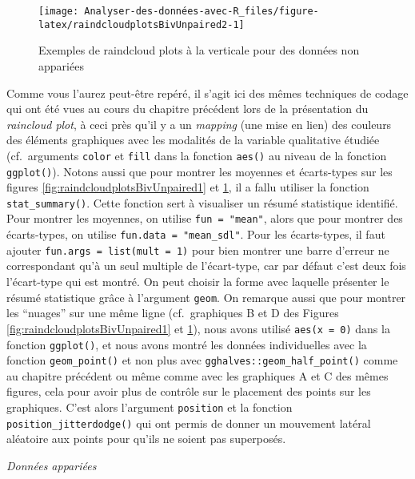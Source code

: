 \documentclass[
  french,
]{book}
\begin{document}
\begin{figure}

{\centering \texttt{[image: Analyser-des-données-avec-R\_files/figure-latex/raindcloudplotsBivUnpaired2-1]} 

}

\caption{Exemples de raindcloud plots à la verticale pour des données non appariées}\label{fig:raindcloudplotsBivUnpaired2}
\end{figure}

Comme vous l'aurez peut-être repéré, il s'agit ici des mêmes techniques de codage qui ont été vues au cours du chapitre précédent lors de la présentation du \emph{raincloud plot}, à ceci près qu'il y a un \emph{mapping} (une mise en lien) des couleurs des éléments graphiques avec les modalités de la variable qualitative étudiée (cf.~arguments \texttt{color} et \texttt{fill} dans la fonction \texttt{aes()} au niveau de la fonction \texttt{ggplot()}). Notons aussi que pour montrer les moyennes et écarts-types sur les figures \ref{fig:raindcloudplotsBivUnpaired1} et \ref{fig:raindcloudplotsBivUnpaired2}, il a fallu utiliser la fonction \texttt{stat\_summary()}. Cette fonction sert à visualiser un résumé statistique identifié. Pour montrer les moyennes, on utilise \texttt{fun\ =\ "mean"}, alors que pour montrer des écarts-types, on utilise \texttt{fun.data\ =\ "mean\_sdl"}. Pour les écarts-types, il faut ajouter \texttt{fun.args\ =\ list(mult\ =\ 1)} pour bien montrer une barre d'erreur ne correspondant qu'à un seul multiple de l'écart-type, car par défaut c'est deux fois l'écart-type qui est montré. On peut choisir la forme avec laquelle présenter le résumé statistique grâce à l'argument \texttt{geom}. On remarque aussi que pour montrer les ``nuages'' sur une même ligne (cf.~graphiques B et D des Figures \ref{fig:raindcloudplotsBivUnpaired1} et \ref{fig:raindcloudplotsBivUnpaired2}), nous avons utilisé \texttt{aes(x\ =\ 0)} dans la fonction \texttt{ggplot()}, et nous avons montré les données individuelles avec la fonction \texttt{geom\_point()} et non plus avec \texttt{gghalves::geom\_half\_point()} comme au chapitre précédent ou même comme avec les graphiques A et C des mêmes figures, cela pour avoir plus de contrôle sur le placement des points sur les graphiques. C'est alors l'argument \texttt{position} et la fonction \texttt{position\_jitterdodge()} qui ont permis de donner un mouvement latéral aléatoire aux points pour qu'ils ne soient pas superposés.

\emph{Données appariées}
\end{document}

